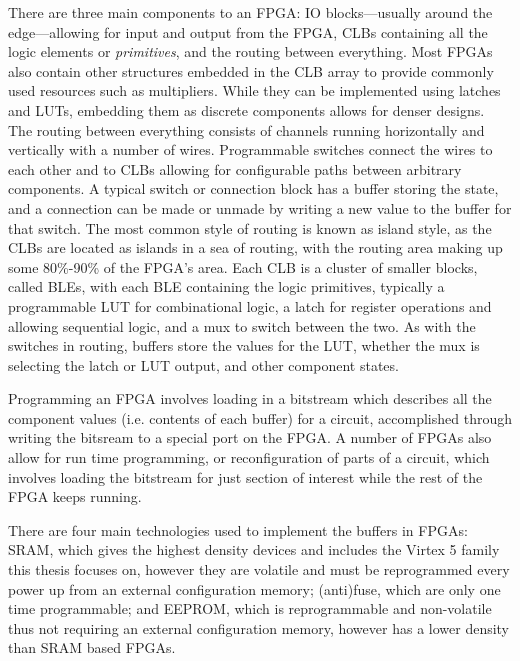 \documentclass[12pt,drafta4paper,oneside]{memoir} %
\begin{document}
There are three main components to an \ac{FPGA}: \ac{IO} blocks---usually around the edge---allowing for input and output from the \ac{FPGA}, \acp{CLB} containing all the logic elements or \emph{primitives}, and the routing between everything.
Most \acp{FPGA} also contain other structures embedded in the \ac{CLB} array to provide commonly used resources such as multipliers. While they can be implemented using latches and \acp{LUT}, embedding them as discrete components allows for denser designs.
The routing between everything consists of channels running horizontally and vertically with a number of wires. Programmable switches connect the wires to each other and to \acp{CLB} allowing for configurable paths between arbitrary components. A typical switch or connection block has a buffer storing the state, and a connection can be made or unmade by writing a new value to the buffer for that switch. The most common style of routing is known as island style, as the \acp{CLB} are located as islands in a sea of routing, with the routing area making up some 80\%-90\% of the \ac{FPGA}'s area\cite{FPGAArch}.
Each \ac{CLB} is a cluster of smaller blocks, called \acp{BLE}, with each \ac{BLE} containing the logic primitives, typically a programmable \ac{LUT} for combinational logic, a latch for register operations and allowing sequential logic, and a \ac{mux} to switch between the two. As with the switches in routing, buffers store the values for the \ac{LUT}, whether the \ac{mux} is selecting the latch or \ac{LUT} output, and other component states.

Programming an \ac{FPGA} involves loading in a bitstream which describes all the component values (i.e. contents of each buffer) for a circuit, accomplished through writing the bitsream to a special port on the \ac{FPGA}. A number of \acp{FPGA} also allow for run time programming, or reconfiguration of parts of a circuit, which involves loading the bitstream for just section of interest while the rest of the \ac{FPGA} keeps running.

There are four main technologies used to implement the buffers in \acp{FPGA}: \ac{SRAM}, which gives the highest density devices and includes the Virtex 5 family this thesis focuses on, however they are volatile and must be reprogrammed every power up from an external configuration memory; (anti)fuse, which are only one time programmable; and \ac{EEPROM}, which is reprogrammable and non-volatile thus not requiring an external configuration memory, however has a lower density than \ac{SRAM} based \acp{FPGA}\cite{FPGAArch}.
\end{document}
